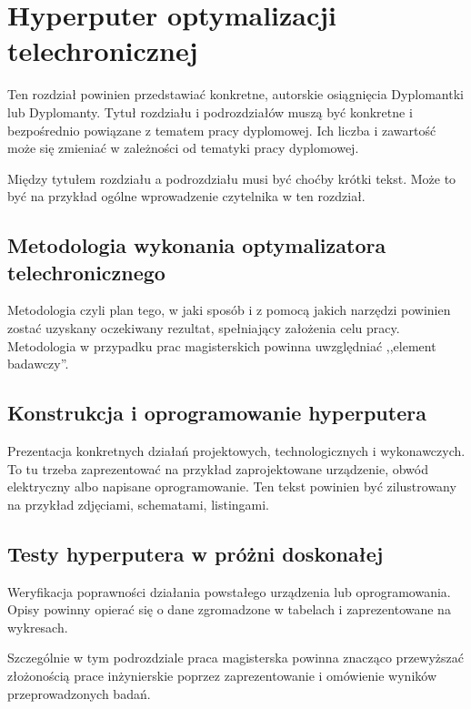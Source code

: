 \chapter{Hyperputer optymalizacji telechronicznej}

Ten rozdział powinien przedstawiać konkretne, autorskie osiągnięcia Dyplomantki lub Dyplomanty. Tytuł rozdziału i podrozdziałów muszą być konkretne i bezpośrednio powiązane z tematem pracy dyplomowej. Ich liczba i zawartość może się zmieniać w zależności od tematyki pracy dyplomowej.

Między tytułem rozdziału a podrozdziału musi być choćby krótki tekst. Może to być na przykład ogólne wprowadzenie czytelnika w ten rozdział.

\section{Metodologia wykonania optymalizatora telechronicznego}

Metodologia czyli plan tego, w jaki sposób i z pomocą jakich narzędzi powinien zostać uzyskany oczekiwany rezultat, spełniający założenia celu pracy. Metodologia w przypadku prac magisterskich powinna uwzględniać ,,element badawczy''.

\section{Konstrukcja i oprogramowanie hyperputera}

Prezentacja konkretnych działań projektowych, technologicznych i wykonawczych. To tu trzeba zaprezentować na przykład zaprojektowane urządzenie, obwód elektryczny albo napisane oprogramowanie. Ten tekst powinien być zilustrowany na przykład zdjęciami, schematami, listingami.

\section{Testy hyperputera w próżni doskonałej}

Weryfikacja poprawności działania powstałego urządzenia lub oprogramowania. Opisy powinny opierać się o dane zgromadzone w tabelach i zaprezentowane na wykresach.

Szczególnie w tym podrozdziale praca magisterska powinna znacząco przewyższać złożonością prace inżynierskie poprzez zaprezentowanie i omówienie wyników przeprowadzonych badań.
